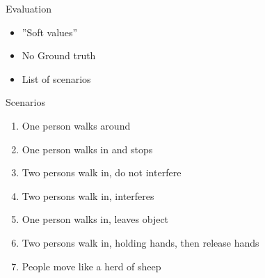 \begin{frame}{Evaluation}
\begin{itemize}
\item ''Soft values''
\item No Ground truth
\item List of scenarios
\end{itemize}
\end{frame}

\begin{frame}{Scenarios}
\begin{enumerate}
\item One person walks around
\item One person walks in and stops
\item Two persons walk in, do not interfere
\item Two persons walk in, interferes
\item One person walks in, leaves object
\item Two persons walk in, holding hands, then release hands
\item People move like a herd of sheep  
\end{enumerate}
\end{frame}